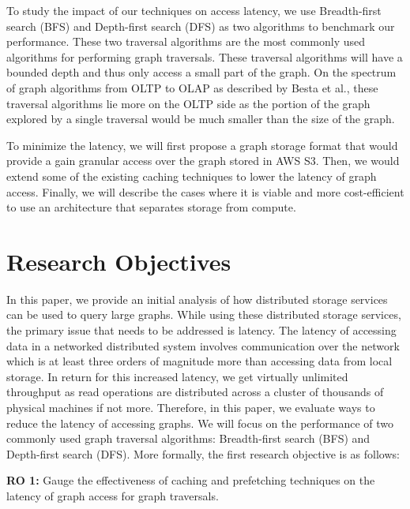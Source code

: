 \medskip
To study the impact of our techniques on access latency, we use
Breadth-first search (BFS) and Depth-first search (DFS) as two algorithms to
benchmark our performance. These two traversal algorithms are the most
commonly used algorithms for performing graph traversals\cite{sahu2017ubiquity}.
These traversal algorithms will have a bounded depth and thus only
access a small part of the graph. On the spectrum of graph algorithms from OLTP
to OLAP as described by Besta et al.\cite{besta2023demystifying}, these 
traversal algorithms lie
more on the OLTP side as the portion of the graph explored by a single traversal
would be much smaller than the size of the graph.

\medskip
To minimize the latency, we will first propose a graph storage format that
would provide a gain granular access over the graph stored in AWS S3. Then, we
would extend some of the existing caching techniques to lower the latency of
graph access. Finally, we will describe the cases where it is viable and more
cost-efficient to use an architecture that separates storage from compute.

\section{Research Objectives}
In this paper, we provide an initial analysis of how distributed storage services can 
be used to query large graphs. While using these distributed storage services, the primary
issue that needs to be addressed is latency. The latency of accessing data in a networked
distributed system involves communication over the network which is at least three orders of
magnitude more than accessing data from local storage. In return for this increased latency,
we get virtually unlimited throughput as read operations are distributed across a cluster 
of thousands of physical machines if not more. Therefore, in this paper, we evaluate ways to
reduce the latency of accessing graphs. We will focus on the 
performance of two commonly used graph traversal algorithms: Breadth-first search 
(BFS) and Depth-first search (DFS). More formally, the first research
objective is as follows:
\begin{displayquote}
    \textbf{RO 1:} Gauge the effectiveness of caching and prefetching techniques
    on the latency of graph access for graph traversals.
\end{displayquote}

